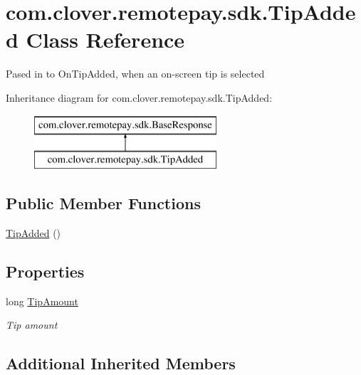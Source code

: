\hypertarget{classcom_1_1clover_1_1remotepay_1_1sdk_1_1_tip_added}{}\section{com.\+clover.\+remotepay.\+sdk.\+Tip\+Added Class Reference}
\label{classcom_1_1clover_1_1remotepay_1_1sdk_1_1_tip_added}


Pased in to On\+Tip\+Added, when an on-\/screen tip is selected  


Inheritance diagram for com.\+clover.\+remotepay.\+sdk.\+Tip\+Added\+:\begin{figure}[H]
\begin{center}
\leavevmode
\includegraphics[height=2.000000cm]{classcom_1_1clover_1_1remotepay_1_1sdk_1_1_tip_added}
\end{center}
\end{figure}
\subsection*{Public Member Functions}
\begin{DoxyCompactItemize}
\item 
\hyperlink{classcom_1_1clover_1_1remotepay_1_1sdk_1_1_tip_added_a1fcf7127a24af8673bfd311ddc81f425}{Tip\+Added} ()
\end{DoxyCompactItemize}
\subsection*{Properties}
\begin{DoxyCompactItemize}
\item 
long \hyperlink{classcom_1_1clover_1_1remotepay_1_1sdk_1_1_tip_added_a837fb32742e50ee6b7690da34cbb6c33}{Tip\+Amount}
\begin{DoxyCompactList}\small\item\em Tip amount \end{DoxyCompactList}\end{DoxyCompactItemize}
\subsection*{Additional Inherited Members}


